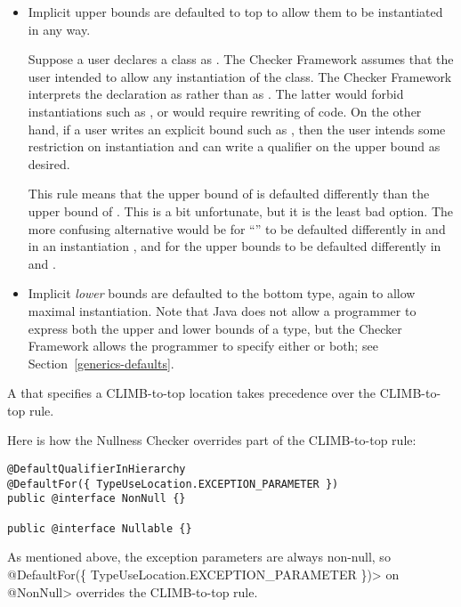 \begin{itemize}
\item
Implicit upper bounds are defaulted to top to allow them to be instantiated
in any way.

Suppose a user declares a class as .
The Checker Framework assumes that the user intended to allow any
instantiation of the class.  The Checker Framework interprets the
declaration as  rather than as .  The latter would forbid
instantiations such as , or would require
rewriting of code.  On the other hand, if a user writes an explicit bound
such as , then the user
intends some restriction on instantiation and can write a qualifier on the
upper bound as desired.

This rule means that the upper bound of  is defaulted
differently than the upper bound of .
This is a bit unfortunate, but it is the least bad option.  The
more confusing alternative would be for ``'' to be defaulted
differently in  and in an
instantiation , and for the upper bounds to be defaulted
differently in 
and .

\item
Implicit \emph{lower} bounds are defaulted to the bottom type, again to allow
maximal instantiation.  Note that Java does not allow a programmer to
express both the upper and lower bounds of a type, but the Checker
Framework allows the programmer to specify either or both;
see Section~\ref{generics-defaults}.

\end{itemize}

A  that specifies a
CLIMB-to-top location takes precedence over the CLIMB-to-top rule.

Here is how the Nullness Checker overrides part of the CLIMB-to-top rule:

\begin{Verbatim}
@DefaultQualifierInHierarchy
@DefaultFor({ TypeUseLocation.EXCEPTION_PARAMETER })
public @interface NonNull {}

public @interface Nullable {}
\end{Verbatim}

\noindent
 As mentioned above, the exception parameters are always non-null, so
\<@DefaultFor(\{ TypeUseLocation.EXCEPTION\_PARAMETER \})> on \<@NonNull> overrides
the CLIMB-to-top rule.


